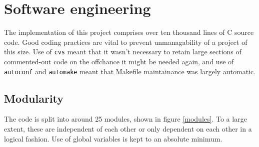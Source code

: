


\section{Software engineering}

The implementation of this project comprises over ten thousand lines of C source code. Good coding practices are vital to prevent unmanagability of a project of this size. Use of {\tt cvs} meant that it wasn't necessary to retain large sections of commented-out code on the offchance it might be needed again, and use of {\tt autoconf} and {\tt automake} meant that Makefile maintainance was largely automatic.

\subsection{Modularity}

The code is split into around 25 modules, shown in figure \ref{modules}. To a large extent, these are independent of each other or only dependent on each other in a logical fashion. Use of global variables is kept to an absolute minimum.

